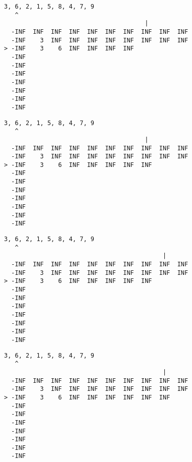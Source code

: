 { \begin{verbatim}
3, 6, 2, 1, 5, 8, 4, 7, 9
   ^
                                       |
  -INF  INF  INF  INF  INF  INF  INF  INF  INF  INF
  -INF    3  INF  INF  INF  INF  INF  INF  INF  INF
> -INF    3    6  INF  INF  INF  INF               
  -INF                                             
  -INF                                             
  -INF                                             
  -INF                                             
  -INF                                             
  -INF                                             
  -INF                                             
\end{verbatim} }

{ \begin{verbatim}
3, 6, 2, 1, 5, 8, 4, 7, 9
   ^
                                       |
  -INF  INF  INF  INF  INF  INF  INF  INF  INF  INF
  -INF    3  INF  INF  INF  INF  INF  INF  INF  INF
> -INF    3    6  INF  INF  INF  INF  INF          
  -INF                                             
  -INF                                             
  -INF                                             
  -INF                                             
  -INF                                             
  -INF                                             
  -INF                                             
\end{verbatim} }

{ \begin{verbatim}
3, 6, 2, 1, 5, 8, 4, 7, 9
   ^
                                            |
  -INF  INF  INF  INF  INF  INF  INF  INF  INF  INF
  -INF    3  INF  INF  INF  INF  INF  INF  INF  INF
> -INF    3    6  INF  INF  INF  INF  INF          
  -INF                                             
  -INF                                             
  -INF                                             
  -INF                                             
  -INF                                             
  -INF                                             
  -INF                                             
\end{verbatim} }

{ \begin{verbatim}
3, 6, 2, 1, 5, 8, 4, 7, 9
   ^
                                            |
  -INF  INF  INF  INF  INF  INF  INF  INF  INF  INF
  -INF    3  INF  INF  INF  INF  INF  INF  INF  INF
> -INF    3    6  INF  INF  INF  INF  INF  INF     
  -INF                                             
  -INF                                             
  -INF                                             
  -INF                                             
  -INF                                             
  -INF                                             
  -INF                                             
\end{verbatim} }

